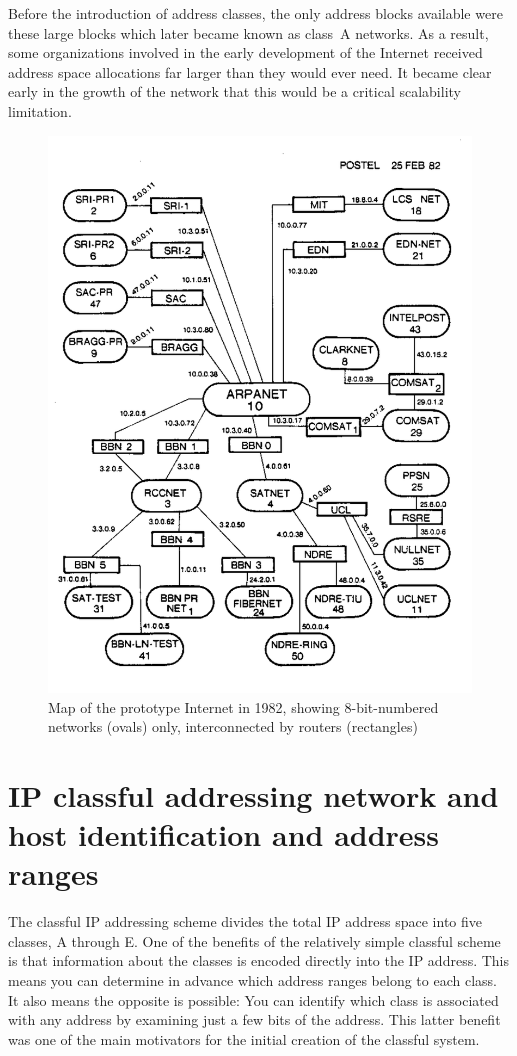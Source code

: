 Before the introduction of address classes, the only address blocks available were these large blocks which later became known as class~A networks.
As a result, some organizations involved in the early development of the Internet received address space allocations far larger than they would ever need.
It became clear early in the growth of the network that this would be a critical scalability limitation.


\begin{figure}
   \centering
   \includegraphics[width=.7\textwidth]{images/prototype-internet.png}
   \caption{Map of the prototype Internet in 1982, showing 8-bit-numbered networks (ovals) only, interconnected by routers (rectangles)}
   \label{fig:prototype-internet}
\end{figure}


\section{IP classful addressing network and host identification and address ranges}

The classful IP addressing scheme divides the total IP address space
into five classes, A through E. One of the benefits of the relatively
simple classful scheme is that information about the classes is encoded
directly into the IP address. This means you can determine in advance
which address ranges belong to each class. It also means the opposite is
possible: You can identify which class is associated with any address by
examining just a few bits of the address. This latter benefit was one of
the main motivators for the initial creation of the classful
system.


